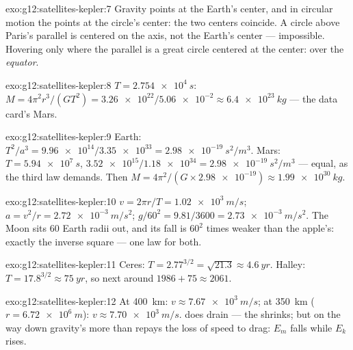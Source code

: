 \begin{solution}{exo:g12:satellites-kepler:7}
Gravity points at the Earth's center, and in circular motion the  points at the circle's center: the two centers coincide. A
circle above Paris's parallel is centered on the axis, not the
Earth's center --- impossible. Hovering  only where the parallel
is a great circle centered at the center: over the \emph{equator}.
\end{solution}

\begin{solution}{exo:g12:satellites-kepler:8}
$T = \qty{2.754e4}{s}$: $M = 4\pi^2 r^3/(GT^2) =
\num{3.26e22}/\num{5.06e-2} \approx \qty{6.4e23}{kg}$ --- the data
card's Mars.
\end{solution}

\begin{solution}{exo:g12:satellites-kepler:9}
Earth: $T^2/a^3 = \num{9.96e14}/\num{3.35e33} =
\qty{2.98e-19}{s^2/m^3}$. Mars: $T = \qty{5.94e7}{s}$,
$\num{3.52e15}/\num{1.18e34} = \qty{2.98e-19}{s^2/m^3}$ --- equal, as
the third law demands. Then $M = 4\pi^2/(G \times \num{2.98e-19})
\approx \qty{1.99e30}{kg}$.
\end{solution}

\begin{solution}{exo:g12:satellites-kepler:10}
$v = 2\pi r/T = \qty{1.02e3}{m/s}$; $a = v^2/r =
\qty{2.72e-3}{m/s^2}$; $g/60^2 = 9.81/3600 = \qty{2.73e-3}{m/s^2}$.
The Moon sits $60$ Earth radii out, and its fall is $60^2$ times
weaker than the apple's: exactly the inverse square --- one law for
both.
\end{solution}

\begin{solution}{exo:g12:satellites-kepler:11}
Ceres: $T = 2.77^{3/2} = \sqrt{21.3} \approx \qty{4.6}{yr}$. Halley:
$T = 17.8^{3/2} \approx \qty{75}{yr}$, so next  around
$1986 + 75 \approx 2061$.
\end{solution}

\begin{solution}{exo:g12:satellites-kepler:12}
At \qty{400}{km}: $v \approx \qty{7.67e3}{m/s}$; at \qty{350}{km}
($r = \qty{6.72e6}{m}$): $v \approx \qty{7.70e3}{m/s}$.  does
drain  --- the  shrinks; but on the way down
gravity's  more than repays the loss of speed to drag:
$E_m$ falls while $E_k$ rises.
\end{solution}

